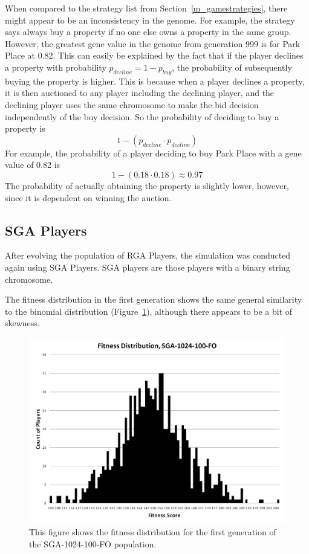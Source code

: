 When compared to the strategy list from Section~\ref{m_gamestrategies}, there
might appear to be an inconsistency in the genome. For example, the strategy
says always buy a property if no one else owns a property in the same group.
However, the greatest gene value in the genome from generation 999 is for Park
Place at 0.82. This can easily be explained by the fact that if the player
declines a property with probability \(p_{decline} = 1-p_{buy}\), the
probability of subsequently buying the property is higher. This is because when
a player declines a property, it is then auctioned to any player including the
declining player, and the declining player uses the same chromosome to make the
bid decision independently of the buy decision. So the probability of deciding
to buy a property is
\begin{equation*}
1-(p_{decline} \cdot p_{decline})
\end{equation*}
For example, the probability of a player deciding to buy Park Place with a
gene value of 0.82 is
\begin{equation*}
1-(0.18 \cdot 0.18) \approx 0.97
\end{equation*}
The probability of actually obtaining the property is slightly lower, however,
since it is dependent on winning the auction.

\subsection{SGA Players} \label{6_SGA}

After evolving the population of RGA Players, the simulation was conducted again
using SGA Players. SGA players are those players with a binary string
chromosome.

The fitness distribution in the first generation shows the same general
similarity to the binomial distribution (Figure~\ref{figure-sga_gen0}), although
there appears to be a bit of skewness.

\begin{figure}[htp]
\centerline{\includegraphics[width=0.75\columnwidth]{Figures/SGA_1024_100_FO_gen0.png}}
\caption[SGA-1024-100-FO Fitness Generation 0]{This figure shows the fitness
distribution for the first generation of the SGA-1024-100-FO population.}
\label{figure-sga_gen0}
\end{figure}

